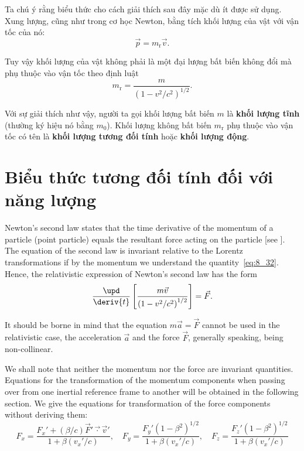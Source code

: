 Ta chú ý rằng biểu thức  cho cách giải thích sau đây mặc dù ít được sử dụng. Xung lượng, cũng như trong cơ học Newton, bằng tích khối lượng của vật với vận tốc của nó:
\begin{equation}\label{eq:8_33}
	\vec{p} = m_{\text{r}}\vec{v}.
\end{equation}

\noindent
Tuy vậy khối lượng của vật không phải là một đại lượng bất biến không đổi mà phụ thuộc vào vận tốc theo định luật
\begin{equation}\label{eq:8_34}
	m_{\text{r}} = \frac{m}{\left(1-v^2/c^2\right)^{1/2}}.
\end{equation}

\noindent
Với sự giải thích như vậy, người ta gọi khối lượng bất biến $m$ là \textbf{khối lượng tĩnh} (thường ký hiệu nó bằng $m_0$). Khối lượng không bất biến $m_{\text{r}}$ phụ thuộc vào vận tốc có tên là \textbf{khối lượng tương đối tính} hoặc \textbf{khối lượng động}.

\section{Biểu thức tương đối tính đối với năng lượng}\label{sec:8_7}

Newton's second law states that the time derivative of the momentum of a particle (point particle) equals the resultant force acting on the particle [see ]. The equation of the second law is invariant relative to the Lorentz transformations if by the momentum we understand the quantity~\eqref{eq:8_32}. Hence, the relativistic expression of Newton's second law has the form
\begin{equation}\label{eq:8_35}
	\frac{\upd}{\deriv{t}}\left[\frac{m\vec{v}}{\left(1-v^2/c^2\right)^{1/2}}\right] = \vec{F}.
\end{equation}

It should be borne in mind that the equation $m\vec{a}=\vec{F}$ cannot be used in the relativistic case, the acceleration $\vec{a}$ and the force $\vec{F}$, generally speaking, being non-collinear.

We shall note that neither the momentum nor the force are invariant quantities. Equations for the transformation of the momentum components when passing over from one inertial reference frame to another will be obtained in the following section. We give the equations for transformation of the force components without deriving them:
\begin{equation}\label{eq:8_36}
	F_x = \frac{F_x' + (\beta/c)\vec{F}'\vec{\cdot}\vec{v}'}{1 + \beta(v_x'/c)},\quad F_y = \frac{F_y'\left(1-\beta^2\right)^{1/2}}{1 + \beta(v_x'/c)},\quad F_z = \frac{F_z'\left(1-\beta^2\right)^{1/2}}{1 + \beta(v_x'/c)}
\end{equation}

